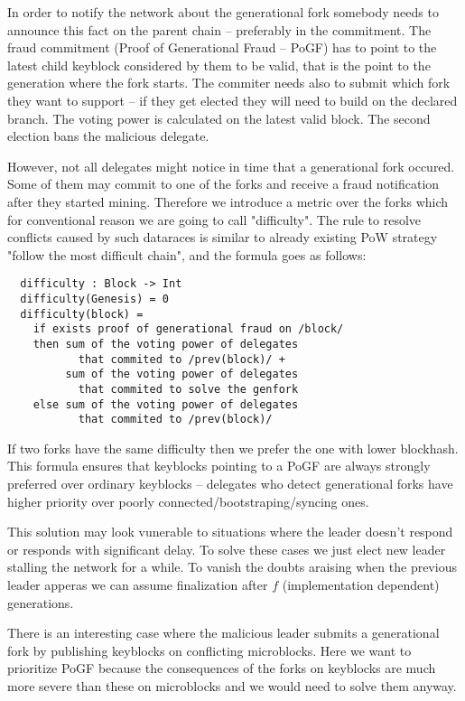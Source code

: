 In order to notify the network about the generational fork somebody needs to announce
this fact on the parent chain – preferably in the commitment. The fraud
commitment (Proof of Generational Fraud – PoGF) has to point to the latest child
keyblock considered by them to be
valid, that is the point to the generation where the fork starts. The commiter
needs also to submit which fork they want to support – if they get elected they
will need to build on the declared branch. The voting power is calculated on the
latest valid block. The second election bans the malicious delegate.

However, not all delegates might notice in time that a generational fork
occured. Some of them may commit to one of the forks and receive a fraud
notification after they started mining. Therefore we introduce a metric over the
forks which for conventional reason we are going to call "difficulty". The
rule to resolve conflicts caused by such dataraces is similar to already
existing PoW strategy "follow the most difficult chain", and the formula goes
as follows:
\begin{minipage}{\linewidth}
\begin{lstlisting}
  difficulty : Block -> Int
  difficulty(Genesis) = 0
  difficulty(block) =
    if exists proof of generational fraud on /block/
    then sum of the voting power of delegates
           that commited to /prev(block)/ +
         sum of the voting power of delegates
           that commited to solve the genfork
    else sum of the voting power of delegates
           that commited to /prev(block)/
\end{lstlisting}
\end{minipage}

If two forks have the same difficulty then we prefer the one with lower
blockhash. This formula ensures that keyblocks pointing to a PoGF are always
strongly preferred over ordinary keyblocks – delegates who detect generational
forks have higher priority over poorly connected/bootstraping/syncing ones.

This solution may look vunerable to situations where the leader doesn't respond
or responds with significant delay. To solve these cases we just elect new
leader stalling the network for a while. To vanish the doubts araising when the
previous leader apperas we can assume
finalization after $f$ (implementation dependent) generations.

There is an interesting case where the malicious leader submits a generational
fork by publishing keyblocks on conflicting microblocks.
Here we want to prioritize PoGF because the consequences of the forks on
keyblocks are much more severe than these on microblocks and we would need to
solve them anyway.

